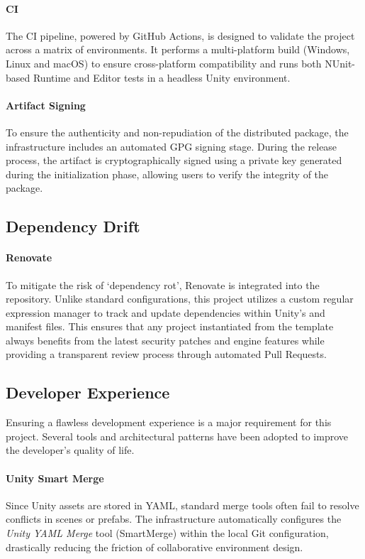 \paragraph{\ac{CI}}
The \ac{CI} pipeline, powered by GitHub Actions, is designed to validate the project across a matrix of environments. It performs a multi-platform build (Windows, Linux and macOS) to ensure cross-platform compatibility and runs both NUnit-based Runtime and Editor tests in a headless Unity environment.

\paragraph{Artifact Signing}
To ensure the authenticity and non-repudiation of the distributed package, the infrastructure includes an automated GPG signing stage. During the release process, the artifact is cryptographically signed using a private key generated during the initialization phase, allowing users to verify the integrity of the package.

\subsection{Dependency Drift}

\paragraph{Renovate}
To mitigate the risk of `dependency rot', Renovate \cite{renovatebot} is integrated into the repository. Unlike standard configurations, this project utilizes a custom regular expression manager to track and update dependencies within Unity's  and manifest files. This ensures that any project instantiated from the template always benefits from the latest security patches and engine features while providing a transparent review process through automated Pull Requests.

\subsection{Developer Experience}

Ensuring a flawless development experience is a major requirement for this project. Several tools and architectural patterns have been adopted to improve the developer's quality of life.

\paragraph{Unity Smart Merge}
Since Unity assets are stored in YAML, standard merge tools often fail to resolve conflicts in scenes or prefabs. The infrastructure automatically configures the \textit{Unity YAML Merge} tool (SmartMerge) \cite{unity_manual_smartmerge_2026} within the local Git configuration, drastically reducing the friction of collaborative environment design.

